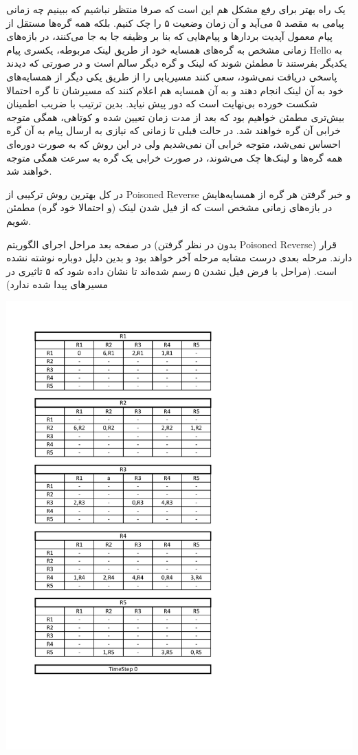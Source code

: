 \documentclass[12pt]{article}
\begin{document}
یک راه بهتر برای رفع مشکل هم این است که صرفا منتظر نباشیم که ببینیم چه زمانی پیامی به مقصد ۵ می‌آید و آن زمان وضعیت ۵ را چک کنیم. بلکه همه گره‌ها مستقل از پیام معمول آپدیت بردارها و پیام‌هایی که بنا بر وظیفه جا به جا می‌کنند، در بازه‌های زمانی مشخص به گره‌های همسایه خود از طریق لینک مربوطه، یکسری پیام Hello به یکدیگر بفرستند تا مطمئن شوند که لینک و گره دیگر سالم است و در صورتی که دیدند پاسخی دریافت نمی‌شود، سعی‌ کنند مسیریابی را از طریق یکی دیگر از همسایه‌های خود به آن لینک انجام دهند و به آن همسایه‌ هم اعلام کنند که مسیرشان تا گره احتمالا شکست خورده بی‌نهایت است که دور پیش نیاید. بدین ترتیب با ضریب اطمینان بیش‌تری مطمئن خواهیم بود که بعد از مدت زمان تعیین شده و کوتاهی، همگی متوجه خرابی آن گره خواهند شد. در حالت قبلی تا زمانی که نیازی به ارسال پیام به آن گره احساس نمی‌شد، متوجه خرابی آن نمی‌شدیم ولی در این روش که به صورت دوره‌ای همه گره‌ها و لینک‌ها چک می‌شوند، در صورت خرابی یک گره به سرعت همگی متوجه خواهند شد.

 
 در کل بهترین روش ترکیبی از Poisoned Reverse و خبر گرفتن هر گره از همسایه‌هایش در بازه‌های زمانی مشخص است که از فیل شدن لینک (و احتمالا خود گره) مطمئن شویم.
 
 
 در صفحه بعد مراحل اجرای الگوریتم (بدون در نظر گرفتن Poisoned Reverse) قرار دارند. مرحله بعدی درست مشابه مرحله آخر خواهد بود و بدین دلیل دوباره نوشته نشده است. (مراحل با فرض فیل نشدن ۵ رسم شده‌اند تا نشان داده شود که ۵ تاثیری در مسیرهای پیدا شده ندارد) 
 
 \newpage
 \begin{center}
 \includegraphics[width = 1.0 \textwidth]{images/1.pdf}
 \end{center}
\end{document}
